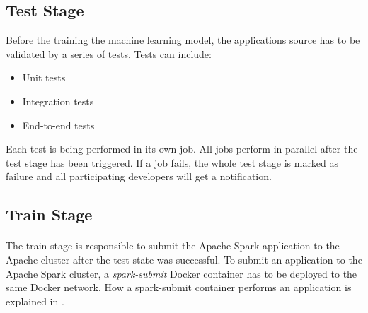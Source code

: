 \subsection{Test Stage}
Before the training the machine learning model, the applications source has to be validated by a series of tests.
Tests can include:
\begin{itemize}
\item Unit tests
\item Integration tests
\item End-to-end tests
\end{itemize}
Each test is being performed in its own job. All jobs perform in parallel after the test stage has been triggered.
If a job fails, the whole test stage is marked as failure and all participating developers will get a notification.


\subsection{Train Stage}
\paragraph{}
The train stage is responsible to submit the Apache Spark application to the Apache cluster after the test state was successful.
To submit an application to the Apache Spark cluster, a \textit{spark-submit} Docker container has to be deployed to the same Docker network. How a spark-submit container performs an application is explained in .

